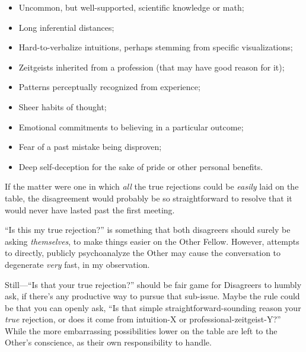 \begin{itemize}
\item {
 Uncommon, but well-supported, scientific knowledge or math;}

\item {
 Long inferential distances;}

\item {
 Hard-to-verbalize intuitions, perhaps stemming from specific
visualizations;}

\item {
 Zeitgeists inherited from a profession (that may have good reason
for it);}

\item {
 Patterns perceptually recognized from experience;}

\item {
 Sheer habits of thought;}

\item {
 Emotional commitments to believing in a particular outcome;}

\item {
 Fear of a past mistake being disproven;}

\item {
 Deep self-deception for the sake of pride or other personal
 benefits.}
\end{itemize}

{
 If the matter were one in which \textit{all} the true rejections
could be \textit{easily} laid on the table, the disagreement would
probably be so straightforward to resolve that it would never have
lasted past the first meeting.}

{
 ``Is this my true rejection?''
is something that both disagreers should surely be asking
\textit{themselves}, to make things easier on the Other Fellow.
However, attempts to directly, publicly psychoanalyze the Other may
cause the conversation to degenerate \textit{very} fast, in my
observation.}

{
 Still---``Is that your true
rejection?'' should be fair game for Disagreers to
humbly ask, if there's any productive way to pursue
that sub-issue. Maybe the rule could be that you can openly ask,
``Is that simple straightforward-sounding reason your
\textit{true} rejection, or does it come from intuition-X or
professional-zeitgeist-Y?'' While the more
embarrassing possibilities lower on the table are left to the
Other's conscience, as their own responsibility to
handle.}

\myendsectiontext

